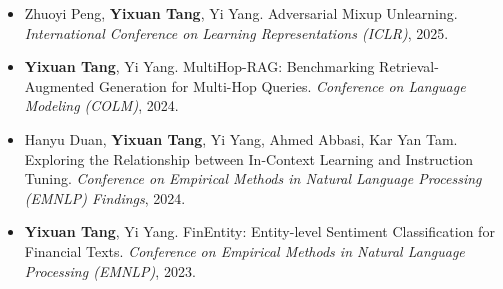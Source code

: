 \documentclass[11pt,a4paper]{article}
\begin{document}
\begin{itemize}[itemsep=3pt]
  \item Zhuoyi Peng, \textbf{Yixuan Tang}, Yi Yang. Adversarial Mixup Unlearning. \textit{International Conference on Learning Representations (ICLR)}, 2025.
  \item \textbf{Yixuan Tang}, Yi Yang. MultiHop-RAG: Benchmarking Retrieval-Augmented Generation for Multi-Hop Queries. \textit{Conference on Language Modeling (COLM)}, 2024.
  \item Hanyu Duan, \textbf{Yixuan Tang}, Yi Yang, Ahmed Abbasi, Kar Yan Tam. Exploring the Relationship between In-Context Learning and Instruction Tuning. \textit{Conference on Empirical Methods in Natural Language Processing (EMNLP) Findings}, 2024.
  \item \textbf{Yixuan Tang}, Yi Yang. FinEntity: Entity-level Sentiment Classification for Financial Texts. \textit{Conference on Empirical Methods in Natural Language Processing (EMNLP)}, 2023.
\end{itemize}
\end{document}
